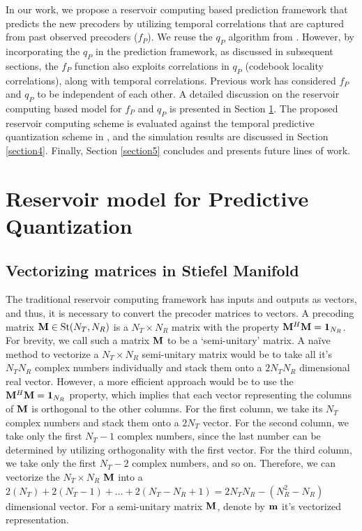 \documentclass[conference]{IEEEtran}
\begin{document}
In our work, we propose a reservoir computing based prediction framework that predicts the new precoders by utilizing  temporal correlations that are captured from past observed precoders ($f_P$).
We reuse the $q_P$ algorithm from \cite{Gupt1905:Predictive,6891198}.
However, by incorporating the $q_P$ in the prediction framework, as discussed in subsequent sections, the $f_P$ function also exploits correlations in $q_P$ (codebook locality correlations), along with temporal correlations.
Previous work \cite{Gupt1905:Predictive,6891198} has considered $f_P$ and $q_P$ to be independent of each other.
A detailed discussion on the reservoir computing based model for $f_P$ and $q_P$ is presented in Section \ref{section3}.
The proposed reservoir computing scheme is evaluated against the temporal predictive quantization scheme in \cite{6891198}, and the simulation results are discussed in Section \ref{section4}. Finally, Section \ref{section5} concludes and presents future lines of work.

\section{Reservoir model for Predictive Quantization}
\label{section3}
\subsection{Vectorizing matrices in Stiefel Manifold}
\label{vectorize}
The traditional reservoir computing framework has inputs and outputs as vectors, and thus, it is necessary to convert the precoder matrices to vectors.
A precoding matrix $\mathcal{{\bf M}} \in \text{St}(N_T,N_R)$ is a $N_T\times N_R$ matrix with the property $\mathcal{{\bf M}}^H\mathcal{{\bf M}}=\text{\textbf{1}}_{N_R}$.
For brevity, we call such a matrix $\mathcal{{\bf M}}$ to be a `semi-unitary' matrix.
A na{\"i}ve method to vectorize a $N_T\times N_R$ semi-unitary matrix would be to take all it's $N_TN_R$ complex numbers individually and stack them onto a $2N_TN_R$ dimensional real vector.
However, a more efficient approach would be to use the $\mathcal{{\bf M}}^H\mathcal{{\bf M}}=\text{\textbf{1}}_{N_R}$ property, which implies that each vector representing the columns of $\mathcal{{\bf M}}$ is orthogonal to the other columns.
For the first column, we take its $N_T$ complex numbers and stack them onto a $2N_T$ vector.
For the second column, we take only the first $N_T-1$ complex numbers, since the last number can be determined by utilizing orthogonality with the first vector.
For the third column, we take only the first $N_T-2$ complex numbers, and so on.
Therefore, we can vectorize the $N_T\times N_R$ $\mathcal{{\bf M}}$ into a $2(N_T)+2(N_T-1)+\ldots+2(N_T-N_R+1)= 2N_TN_R-(N_R^2-N_R)$ dimensional vector.
For a semi-unitary matrix $\mathcal{{\bf M}}$, denote by $\mathcal{{\bf m}}$ it's vectorized representation.
\end{document}
